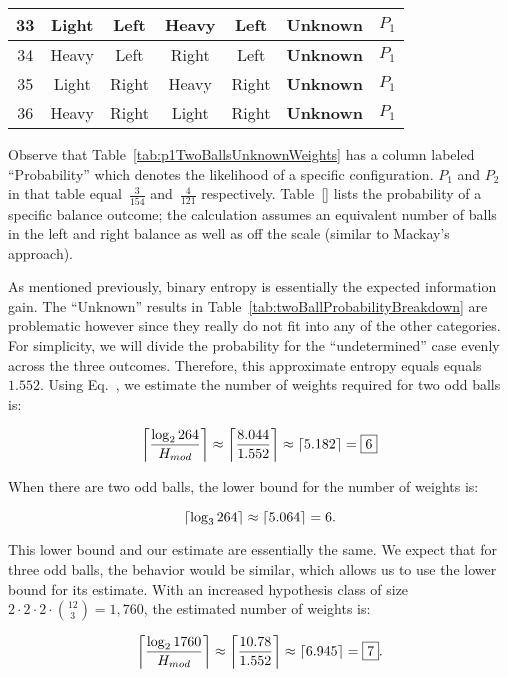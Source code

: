 \begin{table}
\begin{tabular}{|c||c|c||c|c||c||c|}
      33  &  Light   &  Left     &  Heavy   &  Left    &  \textbf{Unknown} & $P_{1}$ \\ \hline
      34  &  Heavy   &  Left     &  Right   &  Left    &  \textbf{Unknown} & $P_{1}$ \\ \hline
      35  &  Light   &  Right    &  Heavy   &  Right   &  \textbf{Unknown} & $P_{1}$ \\ \hline
      36  &  Heavy   &  Right    &  Light   &  Right   &  \textbf{Unknown} & $P_{1}$ \\ \hline
    \end{tabular}
  \end{table}

  
  \noindent
  Observe that Table~\ref{tab:p1TwoBallsUnknownWeights} has a column labeled ``Probability'' which denotes the likelihood of a specific configuration.  $P_{1}$ and $P_{2}$ in that table equal~$\frac{3}{154}$ and~$\frac{4}{121}$ respectively.  Table~\ref{} lists the probability of a specific balance outcome; the calculation assumes an equivalent number of balls in the left and right balance as well as off the scale (similar to Mackay's approach).
  
  As mentioned previously, binary entropy is essentially the expected information gain. The ``Unknown'' results in Table~\ref{tab:twoBallProbabilityBreakdown} are problematic however since they really do not fit into any of the other categories.  For simplicity, we will divide the probability for the ``undetermined'' case evenly across the three outcomes.  Therefore, this approximate entropy equals equals~$1.552$.   Using Eq.~, we estimate the number of weights required for two odd balls is:
  
  \[ \ceil*{\frac{\log_{2} 264}{H_{mod}}} \approx \ceil*{\frac{8.044}{1.552}} \approx \ceil*{5.182} = \boxed{6} \]
  
  When there are two odd balls, the lower bound for the number of weights is:
  
  \[ \ceil{\log_3 264} \approx \ceil{5.064} = 6\text{.} \]
  
  \noindent
  This lower bound and our estimate are essentially the same.  We expect that for three odd balls, the behavior would be similar, which allows us to use the lower bound for its estimate.  With an increased hypothesis class of size~${2\cdot2\cdot2\cdot\binom{12}{3} = 1,760}$, the estimated number of weights is:
  
  \[ \ceil*{\frac{\log_{2} 1760}{H_{mod}}} \approx \ceil*{\frac{10.78}{1.552}} \approx \ceil*{6.945} = \boxed{7} \text{.}\]

